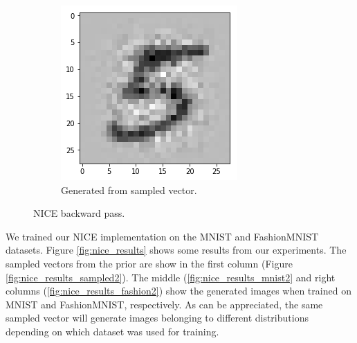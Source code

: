 \begin{figure}[htbp!]
\begin{subfigure}[b]{0.45\textwidth}
         \includegraphics[width=\textwidth]{Images/generated.png}
         \caption{Generated from sampled vector.}
         \label{fig:nice_generated}
     \end{subfigure}
        \caption{NICE backward pass.}
        \label{fig:nice_backward}
\end{figure}

We trained our NICE implementation on the MNIST and FashionMNIST datasets. Figure \ref{fig:nice_results} shows some results from our experiments. The sampled vectors from the prior are show in the first column (Figure \ref{fig:nice_results_sampled2}). The middle (\ref{fig:nice_results_mnist2} and right columns (\ref{fig:nice_results_fashion2}) show the generated images when trained on MNIST and FashionMNIST, respectively. As can be appreciated, the same sampled vector will generate images belonging to different distributions depending on which dataset was used for training.

